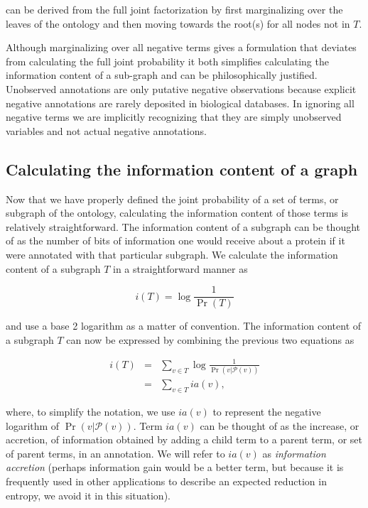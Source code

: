  can be derived from the full joint factorization by first marginalizing over the leaves of the ontology and then moving towards the root(s) for all nodes not in $T$.  

Although marginalizing over all negative terms gives a formulation that deviates from calculating the full joint probability it both simplifies calculating the information content of a sub-graph and can be philosophically justified. Unobserved annotations are only putative negative observations because explicit negative annotations are rarely deposited in biological databases.  In ignoring all negative terms we are implicitly recognizing that they are simply unobserved variables and not actual negative annotations.  

\subsection{Calculating the information content of a graph}

Now that we have properly defined the joint probability of a set of terms, or subgraph of the ontology, calculating the information content of those terms is relatively straightforward.  The information content of a subgraph can be thought of as the number of bits of information one would receive about a protein if it were annotated with that particular subgraph. We calculate the information content of a subgraph $T$ in a straightforward manner as

\[
i(T)=\log\frac{1}{\Pr(T)}
\]


\noindent and use a base 2 logarithm as a matter of convention. The information content of a subgraph $T$ can now be expressed by combining the previous two equations as

\begin{eqnarray*}
i(T) & = & \underset{v\in T}{\sum}\log\frac{1}{\Pr(v|\mathcal{P}(v))}\\
 & = & \underset{v\in T}{\sum}ia(v),
\end{eqnarray*}


\noindent where, to simplify the notation, we use $ia(v)$ to represent the negative logarithm of $\Pr(v|\mathcal{P}(v))$. Term $ia(v)$ can be thought of as the increase, or accretion, of information obtained by adding a child term to a parent term, or set of parent terms, in an annotation. We will refer to $ia(v)$ as \emph{information accretion} (perhaps information gain would be a better term, but because it is frequently used in other applications to describe an expected reduction in entropy, we avoid it in this situation).


